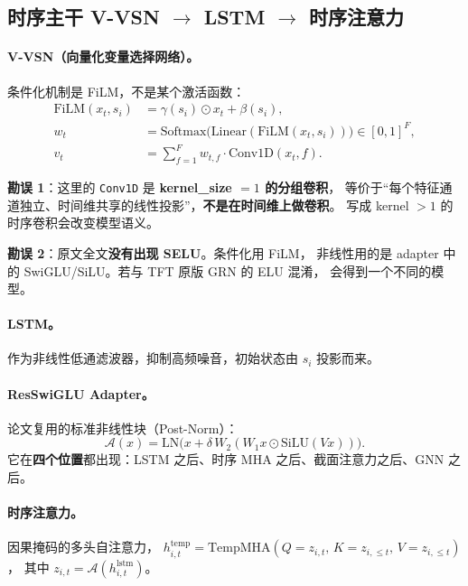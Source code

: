 \documentclass[11pt, a4paper]{ctexart}
\begin{document}
\subsection{时序主干 V-VSN $\to$ LSTM $\to$ 时序注意力}

\paragraph{V-VSN（向量化变量选择网络）。}条件化机制是 FiLM，不是某个激活函数：
\begin{align}
\mathrm{FiLM}(x_t, s_i) &= \gamma(s_i) \odot x_t + \beta(s_i), \\
w_t &= \mathrm{Softmax}\bigl(\mathrm{Linear}(\mathrm{FiLM}(x_t, s_i))\bigr) \in [0,1]^F, \\
v_t &= \sum_{f=1}^{F} w_{t,f}\cdot \mathrm{Conv1D}(x_t, f).
\end{align}

\begin{warnbox}
\textbf{勘误 1}：这里的 \texttt{Conv1D} 是 \textbf{kernel\_size $=1$ 的分组卷积}，
等价于“每个特征通道独立、时间维共享的线性投影”，\textbf{不是在时间维上做卷积}。
写成 kernel $>1$ 的时序卷积会改变模型语义。
\end{warnbox}

\begin{warnbox}
\textbf{勘误 2}：原文全文\textbf{没有出现 SELU}。条件化用 FiLM，
非线性用的是 adapter 中的 SwiGLU/SiLU。若与 TFT 原版 GRN 的 ELU 混淆，
会得到一个不同的模型。
\end{warnbox}

\paragraph{LSTM。}作为非线性低通滤波器，抑制高频噪音，初始状态由 $s_i$ 投影而来。

\paragraph{ResSwiGLU Adapter。}论文复用的标准非线性块（Post-Norm）：
\begin{equation}
\mathcal{A}(x) = \mathrm{LN}\bigl(x + \delta\,W_2(W_1 x \odot \mathrm{SiLU}(Vx))\bigr).
\end{equation}
它在\textbf{四个位置}都出现：LSTM 之后、时序 MHA 之后、截面注意力之后、GNN 之后。

\paragraph{时序注意力。}因果掩码的多头自注意力，
$h^{\text{temp}}_{i,t} = \mathrm{TempMHA}(Q{=}z_{i,t},\,K{=}z_{i,\le t},\,V{=}z_{i,\le t})$，
其中 $z_{i,t} = \mathcal{A}(h^{\text{lstm}}_{i,t})$。
\end{document}
